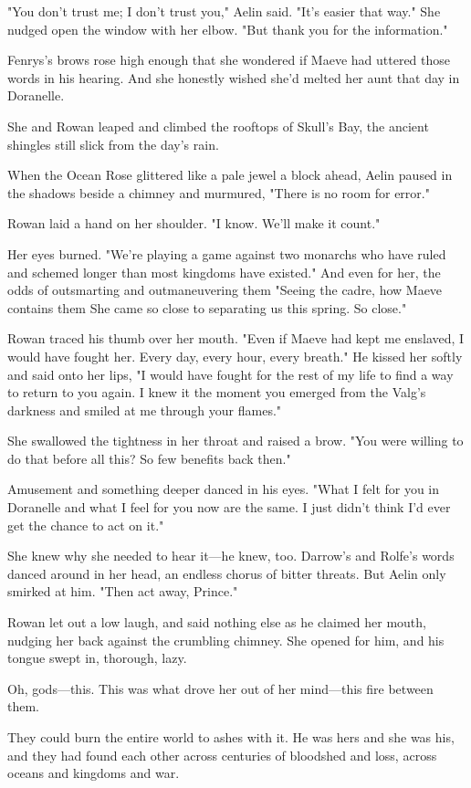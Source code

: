 "You don't trust me; I don't trust you," Aelin said. "It's easier that way." She nudged open the window with her elbow. "But thank you for the information."

Fenrys's brows rose high enough that she wondered if Maeve had uttered those words in his hearing. And she honestly wished she'd melted her aunt that day in Doranelle.

She and Rowan leaped and climbed the rooftops of Skull's Bay, the ancient shingles still slick from the day's rain.

When the Ocean Rose glittered like a pale jewel a block ahead, Aelin paused in the shadows beside a chimney and murmured, "There is no room for error."

Rowan laid a hand on her shoulder. "I know. We'll make it count."

Her eyes burned. "We're playing a game against two monarchs who have ruled and schemed longer than most kingdoms have existed." And even for her, the odds of outsmarting and outmaneuvering them  "Seeing the cadre, how Maeve contains them  She came so close to separating us this spring. So close."

Rowan traced his thumb over her mouth. "Even if Maeve had kept me enslaved, I would have fought her. Every day, every hour, every breath." He kissed her softly and said onto her lips, "I would have fought for the rest of my life to find a way to return to you again. I knew it the moment you emerged from the Valg's darkness and smiled at me through your flames."

She swallowed the tightness in her throat and raised a brow. "You were willing to do that before all this? So few benefits back then."

Amusement and something deeper danced in his eyes. "What I felt for you in Doranelle and what I feel for you now are the same. I just didn't think I'd ever get the chance to act on it."

She knew why she needed to hear it---he knew, too. Darrow's and Rolfe's words danced around in her head, an endless chorus of bitter threats. But Aelin only smirked at him. "Then act away, Prince."

Rowan let out a low laugh, and said nothing else as he claimed her mouth, nudging her back against the crumbling chimney. She opened for him, and his tongue swept in, thorough, lazy.

Oh, gods---this. This was what drove her out of her mind---this fire between them.

They could burn the entire world to ashes with it. He was hers and she was his, and they had found each other across centuries of bloodshed and loss, across oceans and kingdoms and war.

